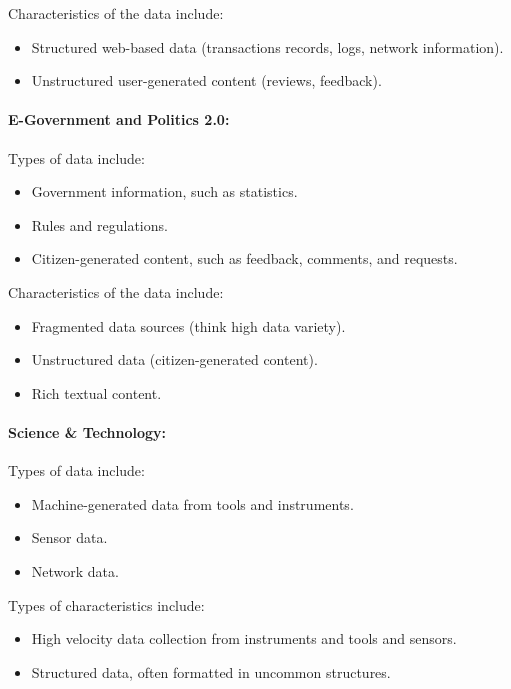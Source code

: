 \documentclass[a4paper,11pt]{article}
\begin{document}
Characteristics of the data include:

\begin{itemize}
  \item Structured web-based data (transactions records, logs, network information).
  \item Unstructured user-generated content (reviews, feedback).
\end{itemize}


\paragraph{E-Government and Politics 2.0:\\}

Types of data include:

\begin{itemize}
  \item Government information, such as statistics.
  \item Rules and regulations.
  \item Citizen-generated content, such as feedback, comments, and requests.
\end{itemize}

Characteristics of the data include:

\begin{itemize}
  \item Fragmented data sources (think high data variety).
  \item Unstructured data (citizen-generated content).
  \item Rich textual content.
\end{itemize}


\paragraph{Science \& Technology:\\}

Types of data include:

\begin{itemize}
  \item Machine-generated data from tools and instruments.
  \item Sensor data.
  \item Network data.
\end{itemize}

Types of characteristics include:

\begin{itemize}
  \item High velocity data collection from instruments and tools and sensors.
  \item Structured data, often formatted in uncommon structures.
\end{itemize}
\end{document}
